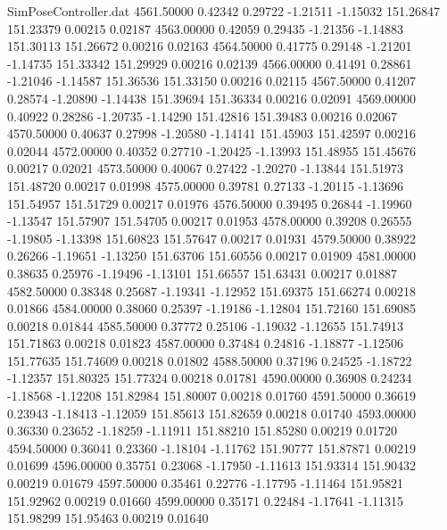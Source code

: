 \begin{filecontents}{SimPoseController.dat}
4561.50000    0.42342    0.29722    -1.21511   -1.15032  151.26847  151.23379    0.00215    0.02187
4563.00000    0.42059    0.29435    -1.21356   -1.14883  151.30113  151.26672    0.00216    0.02163
4564.50000    0.41775    0.29148    -1.21201   -1.14735  151.33342  151.29929    0.00216    0.02139
4566.00000    0.41491    0.28861    -1.21046   -1.14587  151.36536  151.33150    0.00216    0.02115
4567.50000    0.41207    0.28574    -1.20890   -1.14438  151.39694  151.36334    0.00216    0.02091
4569.00000    0.40922    0.28286    -1.20735   -1.14290  151.42816  151.39483    0.00216    0.02067
4570.50000    0.40637    0.27998    -1.20580   -1.14141  151.45903  151.42597    0.00216    0.02044
4572.00000    0.40352    0.27710    -1.20425   -1.13993  151.48955  151.45676    0.00217    0.02021
4573.50000    0.40067    0.27422    -1.20270   -1.13844  151.51973  151.48720    0.00217    0.01998
4575.00000    0.39781    0.27133    -1.20115   -1.13696  151.54957  151.51729    0.00217    0.01976
4576.50000    0.39495    0.26844    -1.19960   -1.13547  151.57907  151.54705    0.00217    0.01953
4578.00000    0.39208    0.26555    -1.19805   -1.13398  151.60823  151.57647    0.00217    0.01931
4579.50000    0.38922    0.26266    -1.19651   -1.13250  151.63706  151.60556    0.00217    0.01909
4581.00000    0.38635    0.25976    -1.19496   -1.13101  151.66557  151.63431    0.00217    0.01887
4582.50000    0.38348    0.25687    -1.19341   -1.12952  151.69375  151.66274    0.00218    0.01866
4584.00000    0.38060    0.25397    -1.19186   -1.12804  151.72160  151.69085    0.00218    0.01844
4585.50000    0.37772    0.25106    -1.19032   -1.12655  151.74913  151.71863    0.00218    0.01823
4587.00000    0.37484    0.24816    -1.18877   -1.12506  151.77635  151.74609    0.00218    0.01802
4588.50000    0.37196    0.24525    -1.18722   -1.12357  151.80325  151.77324    0.00218    0.01781
4590.00000    0.36908    0.24234    -1.18568   -1.12208  151.82984  151.80007    0.00218    0.01760
4591.50000    0.36619    0.23943    -1.18413   -1.12059  151.85613  151.82659    0.00218    0.01740
4593.00000    0.36330    0.23652    -1.18259   -1.11911  151.88210  151.85280    0.00219    0.01720
4594.50000    0.36041    0.23360    -1.18104   -1.11762  151.90777  151.87871    0.00219    0.01699
4596.00000    0.35751    0.23068    -1.17950   -1.11613  151.93314  151.90432    0.00219    0.01679
4597.50000    0.35461    0.22776    -1.17795   -1.11464  151.95821  151.92962    0.00219    0.01660
4599.00000    0.35171    0.22484    -1.17641   -1.11315  151.98299  151.95463    0.00219    0.01640

\end{filecontents}
